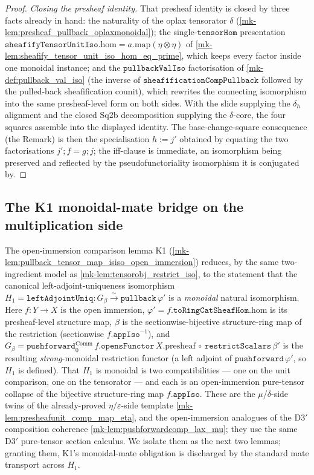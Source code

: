 \begin{proof}
  \emph{Closing the presheaf identity.} That presheaf identity is closed by three facts
  already in hand: the naturality of the oplax tensorator \(\delta\)
  (\ref{mk-lem:presheaf_pullback_oplaxmonoidal}); the single-\(\mathtt{tensorHom}\)
  presentation \(\mathtt{sheafifyTensorUnitIso}.\mathrm{hom} = a.\mathrm{map}(\eta\otimes\eta)\)
  of \ref{mk-lem:sheafify_tensor_unit_iso_hom_eq_prime}, which keeps every factor inside one
  monoidal instance; and the \(\mathtt{pullbackValIso}\) factorisation of
  \ref{mk-def:pullback_val_iso} (the inverse of \(\mathtt{sheafificationCompPullback}\) followed
  by the pulled-back sheafification counit), which rewrites the connecting isomorphism into
  the same presheaf-level form on both sides. With the slide supplying the \(\delta_h\)
  alignment and the closed Sq2b decomposition supplying the \(\delta\)-core, the four squares
  assemble into the displayed identity. The base-change-square consequence (the Remark) is
  then the specialisation \(h := j'\) obtained by equating the two factorisations
  \(j' \mathbin{;} f = g \mathbin{;} j\); the iff-clause is immediate, an isomorphism being
  preserved and reflected by the pseudofunctoriality isomorphism it is conjugated by.
\end{proof}

\subsection{The K1 monoidal-mate bridge on the multiplication side}

The open-immersion comparison lemma K1 (\ref{mk-lem:pullback_tensor_map_isiso_open_immersion})
reduces, by the same two-ingredient model as \ref{mk-lem:tensorobj_restrict_iso}, to the
statement that the canonical left-adjoint-uniqueness isomorphism
\(H_1 = \mathtt{leftAdjointUniq} : G_\beta \xrightarrow{\sim} \mathtt{pullback}\,\varphi'\) is a
\emph{monoidal} natural isomorphism. Here \(f : Y \to X\) is the open immersion,
\(\varphi' = f.\mathtt{toRingCatSheafHom}.\mathrm{hom}\) is its presheaf-level structure map,
\(\beta\) is the sectionwise-bijective structure-ring map of the restriction (sectionwise
\(f.\mathtt{appIso}^{-1}\)), and
\(G_\beta = \mathtt{pushforward}_0^{\mathrm{Comm}}\,f.\mathtt{opensFunctor}\,X.\mathrm{presheaf}
\,\circ\, \mathtt{restrictScalars}\,\beta'\) is the resulting \emph{strong}-monoidal restriction
functor (a left adjoint of \(\mathtt{pushforward}\,\varphi'\), so \(H_1\) is defined). That \(H_1\)
is monoidal is two compatibilities --- one on the unit comparison, one on the tensorator --- and
each is an open-immersion pure-tensor collapse of the bijective structure-ring map
\(f.\mathtt{appIso}\). These are the $\mu$/$\delta$-side twins of the already-proved $\eta$/$\varepsilon$-side
template \ref{mk-lem:presheafunit_comp_map_eta}, and the open-immersion analogues of the D3$'$
composition coherence \ref{mk-lem:pushforwardcomp_lax_mu}; they use the same D3$'$ pure-tensor
section calculus. We isolate them as the next two lemmas; granting them, K1's
monoidal-mate obligation is discharged by the standard mate transport across \(H_1\).

